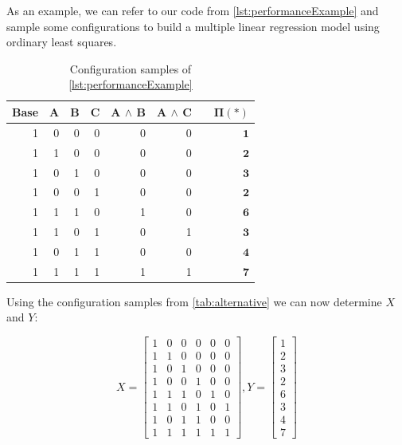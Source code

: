 As an example, we can refer to our code from \autoref{lst:performanceExample}
and sample some configurations to build a multiple linear regression model using ordinary least squares.

\begin{table}[H]
    \centering
    \begin{tabular}{rrrrrrrr}
    \hline
    Base & A & B & C & A $\land$ B & A $\land$ C &  & $\bm{\Pi(*)}$ \\ \hline
    1    & 0 & 0 & 0 & 0           & 0           &  &  $\mathbf{1}$   \\
    1    & 1 & 0 & 0 & 0           & 0           &  &  $\mathbf{2}$   \\
    1    & 0 & 1 & 0 & 0           & 0           &  &   $\mathbf{3}$  \\  
    1    & 0 & 0 & 1 & 0           & 0           &  &   $\mathbf{2}$  \\  
    1    & 1 & 1 & 0 & 1           & 0           &  &   $\mathbf{6}$   \\
    1    & 1 & 0 & 1 & 0           & 1           &  &   $\mathbf{3}$  \\  
    1    & 0 & 1 & 1 & 0           & 0           &  &   $\mathbf{4}$  \\  
    1    & 1 & 1 & 1 & 1           & 1           &  &   $\mathbf{7}$  \\ \hline

    \end{tabular}  
    \caption{Configuration samples of \autoref{lst:performanceExample}}
\end{table}

Using the configuration samples from \autoref{tab:alternative} we can now determine $\textit{X}$ and $\textit{Y}$:

\begin{displaymath}
    \textit{X} = 
    \begin{bmatrix} 
        1 & 0 & 0 & 0 & 0 & 0 \\
        1 & 1 & 0 & 0 & 0 & 0 \\
        1 & 0 & 1 & 0 & 0 & 0 \\
        1 & 0 & 0 & 1 & 0 & 0 \\
        1 & 1 & 1 & 0 & 1 & 0 \\
        1 & 1 & 0 & 1 & 0 & 1 \\
        1 & 0 & 1 & 1 & 0 & 0 \\
        1 & 1 & 1 & 1 & 1 & 1 
      \end{bmatrix}
      ,
      \textit{Y} =
      \begin{bmatrix}
        1 \\
        2 \\
        3 \\
        2 \\
        6 \\
        3 \\
        4 \\
        7 
      \end{bmatrix}
\end{displaymath}


